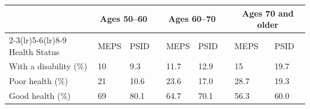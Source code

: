  
   
   
   
   \begin{tabular}
{p{3.7cm}p{1.2cm}p{1.2cm}p{.1cm}p{1.2cm}p{1.2cm}p{.1cm}p{1.2cm}p{1.2cm}}
    \toprule
 \hline
 &\multicolumn{2}{c}{Ages 50--60} &&\multicolumn{2}{c}{Ages 60--70}&&\multicolumn{2}{c}{Ages 70 and older}\\%
 \cmidrule(lr){2-3}\cmidrule(lr){5-6}\cmidrule(lr){8-9}
Health Status & MEPS& PSID&& MEPS& PSID&& MEPS& PSID\\[0.5ex]
 \hline
With a disability (\%)	&	10	&	9.3	&&	11.7	&	12.9	 &&15&19.7\\
Poor health (\%)&	21	&	10.6	&&	23.6	&	17.0	&& 28.7&19.3\\
Good health (\%)&	69	&	80.1	&&	64.7	&	70.1	&&56.3&60.0\\ [0.5ex] 
  \hline
 \bottomrule
    \end{tabular}
